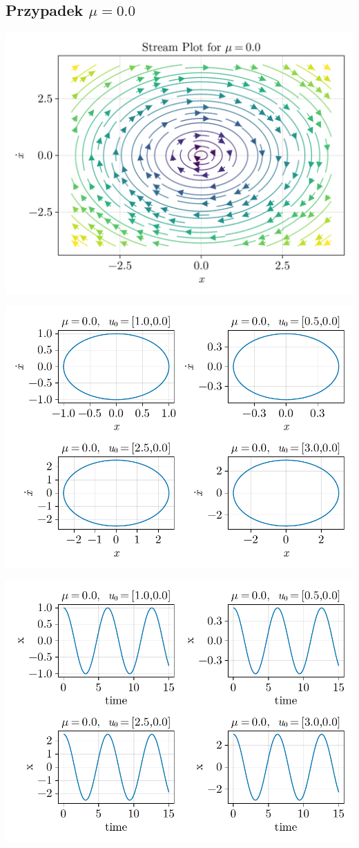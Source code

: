 
%
%
\subsection{Przypadek $\mu = 0.0$}
\includegraphics[width=\textwidth]{out/stream_01.png}

\includegraphics[width=\textwidth]{out/phase_01.pdf}

\includegraphics[width=\textwidth]{out/xfromt_01.pdf}

